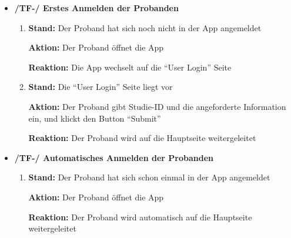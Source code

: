 \documentclass[a4paper]{scrreprt}
\begin{document}
            \begin{itemize}

            \item \textbf{/TF-/ Erstes Anmelden der \gls{Proband}en}
            \begin{enumerate}
                \item \par \textbf{Stand: }Der \gls{Proband} hat sich noch nicht in der App angemeldet
                \par \textbf{Aktion: }Der \gls{Proband} öffnet die App
                \par \textbf{Reaktion: }Die App wechselt auf die ``User Login'' Seite
                \item \par \textbf{Stand: }Die ``User Login'' Seite liegt vor
                \par \textbf{Aktion: }Der \gls{Proband} gibt Studie-ID und die angeforderte Information ein, und klickt den Button ``Submit''
                \par \textbf{Reaktion: }Der \gls{Proband} wird auf die Hauptseite weitergeleitet
            \end{enumerate}

	        \item \textbf{/TF-/ Automatisches Anmelden der \gls{Proband}en}
	        \begin{enumerate}
	        	\item \par \textbf{Stand: }Der \gls{Proband} hat sich schon einmal in der App angemeldet
	        	\par \textbf{Aktion: }Der \gls{Proband} öffnet die App
	        	\par \textbf{Reaktion: }Der \gls{Proband} wird automatisch auf die Hauptseite weitergeleitet
	        \end{enumerate}


\end{itemize}
\end{document}
